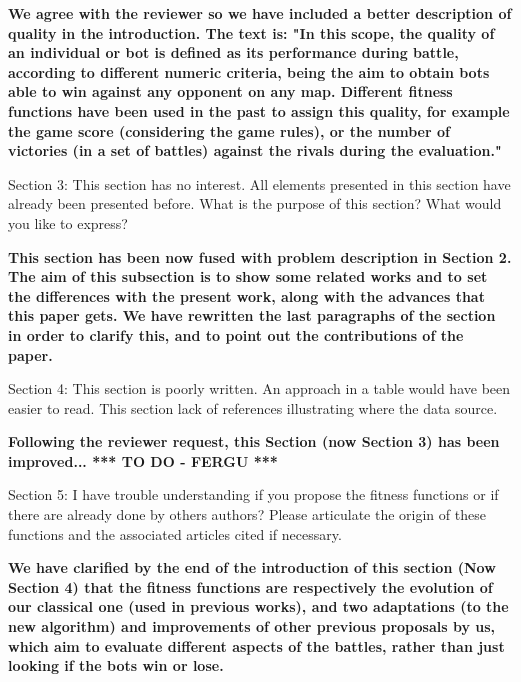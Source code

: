 \documentclass{article}
\begin{document}
\vspace{0.5cm} \textbf{We agree with the reviewer so we have included a better description of quality in the introduction. The text is:
"In this scope, the quality of an individual or bot is defined as its performance during battle, according to different numeric criteria, being the aim to obtain bots able to win against any opponent on any map.
Different fitness functions have been used in the past to assign this quality, for example the game score (considering the game rules), or the number of victories (in a set of battles) against the rivals during the evaluation."} \vspace{0.5cm}


Section 3: This section has no interest. All elements presented in this section have already been presented before. What is the purpose of this section? What would you like to express?

\vspace{0.5cm} \textbf{This section has been now fused with problem description in Section 2. The aim of this subsection is to show some related works and to set the differences with the present work, along with the advances that this paper gets. We have rewritten the last paragraphs of the section in order to clarify this, and to point out the contributions of the paper.} \vspace{0.5cm}


Section 4: This section is poorly written. An approach in a table would have been easier to read. This section lack of references illustrating where the data source.

\vspace{0.5cm} \textbf{Following the reviewer request, this Section (now Section 3) has been improved... *** TO DO - FERGU ***} \vspace{0.5cm}


Section 5: I have trouble understanding if you propose the fitness functions or if there are already done by others authors? Please articulate the origin of these functions and the associated articles cited if necessary.

\vspace{0.5cm} \textbf{We have clarified by the end of the introduction of this section (Now Section 4) that the fitness functions are respectively the evolution of our classical one (used in previous works), and two adaptations (to the new algorithm) and improvements of other previous proposals by us, which aim to evaluate different aspects of the battles, rather than just looking if the bots win or lose.} \vspace{0.5cm}
\end{document}
